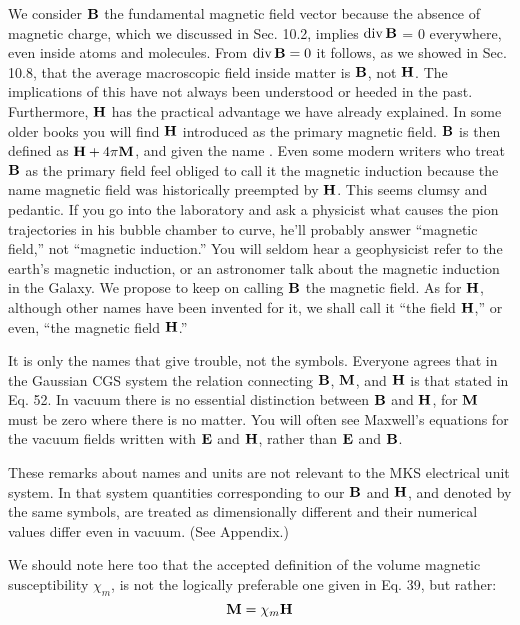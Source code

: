 We consider $\mathbf{B}$ the fundamental magnetic field vector because the
absence of magnetic charge, which we discussed in Sec. 10.2, implies
$\operatorname{div}\mathbf{B}$ = 0 everywhere, even inside atoms and molecules. From
$\operatorname{div}\mathbf{B} = 0$ it follows, as we showed in Sec. 10.8, that the average
macroscopic field inside matter is $\mathbf{B}$, not $\mathbf{H}$. The implications of
this have not always been understood or heeded in the past. 
Furthermore, $\mathbf{H}$ has the practical advantage we have already explained. In
some older books you will find $\mathbf{H}$ introduced as the primary magnetic
field. $\mathbf{B}$ is then defined as $\mathbf{H}+ 4\pi\mathbf{M}$, and given the name 
. Even some modern writers who treat $\mathbf{B}$ as the primary
field feel obliged to call it the magnetic induction because the name
magnetic field was historically preempted by $\mathbf{H}$. This seems clumsy
and pedantic. If you go into the laboratory and ask a physicist what
causes the pion trajectories in his bubble chamber to curve, he'll
probably answer ``magnetic field,'' not ``magnetic induction.'' You
will seldom hear a geophysicist refer to the earth's magnetic 
induction, or an astronomer talk about the magnetic induction in the
Galaxy. We propose to keep on calling $\mathbf{B}$ the magnetic field. As
for $\mathbf{H}$, although other names have been invented for it, we shall call
it ``the field $\mathbf{H}$,'' or even, ``the magnetic field $\mathbf{H}$.''

It is only the names that give trouble, not the symbols. Everyone
agrees that in the Gaussian CGS system the relation connecting $\mathbf{B}$,
$\mathbf{M}$, and $\mathbf{H}$ is that stated in Eq. 52. In vacuum there is no essential
distinction between $\mathbf{B}$ and $\mathbf{H}$, for $\mathbf{M}$ must be zero where there is no
matter. You will often see Maxwell's equations for the vacuum fields
written with $\mathbf{E}$ and $\mathbf{H}$, rather than $\mathbf{E}$ and $\mathbf{B}$.

These remarks about names and units are not relevant to the MKS
electrical unit system. In that system quantities corresponding to
our $\mathbf{B}$ and $\mathbf{H}$, and denoted by the same symbols, are treated as
dimensionally different and their numerical values differ even in
vacuum. (See Appendix.)


We should note here too that the accepted definition of the volume
magnetic susceptibility $\chi_m$, is not the logically preferable one given
in Eq. 39, but rather:
\begin{equation}
  \mathbf{M} = \chi_m\mathbf{H}
\end{equation}

